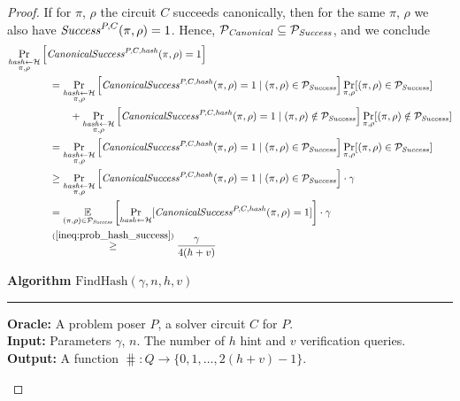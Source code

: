 \begin{proof}
If for $\pi$, $\rho$ the circuit $C$ succeeds canonically, then for the same $\pi$, $\rho$ we also have $\operatorname{\mathit{Success}}^{P, C}(\pi, \rho) = 1$.
Hence, $\mathcal{P}_{\mathit{Canonical}} \subseteq \mathcal{P}_{\mathit{Success}}$, and we conclude
\begin{align}
  \label{ineq:hash_high_prob}
&\underset{\substack{\hash \leftarrow \cH \\ \pi, \rho}}{\Pr}\left[\CanonicalSuccess^{P, C, \hash}(\pi, \rho) = 1\right] \notag\\
&\IndII = \underset{\substack{\hash \leftarrow \cH \\ \pi, \rho}}{\Pr}\left[\CanonicalSuccess^{P,C,\hash}(\pi, \rho) = 1 \mid (\pi, \rho) \in \cP_{\mathit{Success}}\right]
\underset{\pi, \rho}{\Pr}[(\pi, \rho) \in \cP_{\mathit{Success}}] \notag\\
&\IndIII + \underset{\substack{\hash \leftarrow \cH \\ \pi, \rho}}{\Pr}\left[\CanonicalSuccess^{P,C,\hash}(\pi, \rho) = 1 \mid (\pi, \rho) \notin \cP_{\mathit{Success}} \right]
\underset{\pi, \rho}{\Pr}[(\pi, \rho) \notin \cP_{\mathit{Success}}] \notag\\
%
&\IndII = \underset{\substack{\hash \leftarrow \cH \\ \pi, \rho}}{\Pr}\left[\CanonicalSuccess^{P,C,\hash}(\pi, \rho) = 1 \mid (\pi, \rho) \in \cP_{\mathit{Success}}\right]
\underset{\pi, \rho}{\Pr}[(\pi, \rho) \in \cP_{\mathit{Success}}] \notag\\
%
&\IndII \geq
\underset{\substack{\hash \leftarrow \cH \\ \pi, \rho}}{\Pr}\left[\CanonicalSuccess^{P,C,\hash}(\pi, \rho) = 1 \mid (\pi, \rho) \in \cP_{\mathit{Success}}\right] \cdot \gamma \notag\\
&\IndII =
\underset{(\pi, \rho) \in \cP_{\mathit{Success}}}
{\mathbb{E}}\left[\underset{\hash \leftarrow \cH}{\Pr}[\CanonicalSuccess^{P,C,\hash}(\pi, \rho) = 1] \right] \cdot \gamma \notag\\
&\IndII \stackrel{(\ref{ineq:prob_hash_success})}{\geq} \frac{\gamma}{4(h+v)}
\end{align}
%
\begin{codeblock}
  \textbf{Algorithm} $\text{FindHash}(\gamma, n, h, v)$
  \medskip
  \hrule
  \medskip
  \textbf{Oracle:} A problem poser $P$, a solver circuit $C$ for $P$.\\
  \textbf{Input:} Parameters $\gamma$, $n$. The number of $h$ hint and $v$ verification queries. \\
  \textbf{Output:} A function $\hash:Q \rightarrow \{0,1, \dots, 2(h+v)-1 \}$.

\end{codeblock}
\end{proof}
